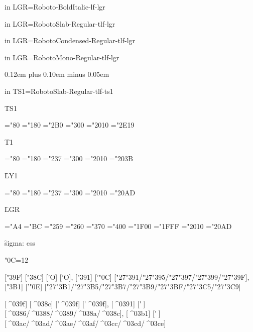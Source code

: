 \font in LGR\LgrZZZBoldItalic=Roboto-BoldItalic-lf-lgr
\LgrZZZBoldItalic
\TextG

\font in LGR\LgrZZZSlabRegular=RobotoSlab-Regular-tlf-lgr
\LgrZZZSlabRegular
\TextG

\font in LGR\LgrZZZCondensedRegular=RobotoCondensed-Regular-tlf-lgr
\LgrZZZCondensedRegular
\TextG

\font in LGR\LgrZZZMonoRegular=RobotoMono-Regular-tlf-lgr
\LgrZZZMonoRegular
\TextG


\vfil
\eject
\spaceskip 0.12em plus 0.10em minus 0.05em

\font in TS1\TSoneZZZSlabRegular=RobotoSlab-Regular-tlf-ts1

{\f TS1}

\TSoneZZZSlabRegular
\ChrA="80 \ChrB="180
\PrintCode
\ChrA="2B0 \ChrB="300
\PrintCode
\ChrA="2010 \ChrB="2E19
\PrintCode

{\f T1}

\ToneZZZSlabRegular
\ChrA="80 \ChrB="180
\PrintCode
\ChrA="237 \ChrB="300
\PrintCode
\ChrA="2010 \ChrB="203B
\PrintCode

{\f LY1}

\LYoneZZZRegular
\ChrA="80 \ChrB="180
\PrintCode
\ChrA="237 \ChrB="300
\PrintCode
\ChrA="2010 \ChrB="20AD
\PrintCode

{\f LGR}

\LgrZZZSlabRegular
\ChrA="A4 \ChrB="BC
\PrintCode
\ChrA="259 \ChrB="260
\PrintCode
\ChrA="370 \ChrB="400
\PrintCode
\ChrA="1F00 \ChrB="1FFF
\PrintCode
\ChrA="2010 \ChrB="20AD
\PrintCode

{\f sigma:} ^^63^^73^^73

\catcode"0C=12

[\char"39F] [\char"38C] ['\relax Ο] ['Ο],
[\char"391] ['\char"0C] [\char"27\char"391/\char"27\char"395/\char"27\char"397/\char"27\char"399/\char"27\char"39F],
[\char"3B1] ['\char"0E] [\char"27\char"3B1/\char"27\char"3B5/\char"27\char"3B7/\char"27\char"3B9/\char"27\char"3BF/\char"27\char"3C5/\char"27\char"3C9]

[^^^^039f] [^^^^038c] ['\relax ^^^^039f] [^^27^^^^039f],
[^^^^0391] [^^27^^0c] [^^^^0386/^^^^0388/^^^^0389/^^^^038a/^^^^038c],
[^^^^03b1] [^^27^^0e] [^^^^03ac/^^^^03ad/^^^^03ae/^^^^03af/^^^^03cc/^^^^03cd/^^^^03ce]

\bye
